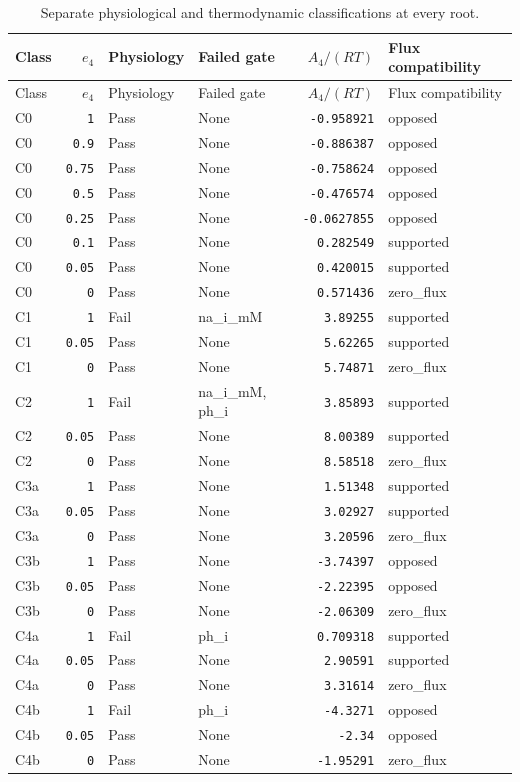 \begingroup\scriptsize
\setlength{\tabcolsep}{3pt}
\begin{longtable}{lrlp{.25\linewidth}rl}
\caption{Separate physiological and thermodynamic classifications at every root.}\\
\toprule
Class & $e_4$ & Physiology & Failed gate & $A_4/(RT)$ & Flux compatibility \\
\midrule\endfirsthead
\toprule
Class & $e_4$ & Physiology & Failed gate & $A_4/(RT)$ & Flux compatibility \\
\midrule\endhead
\bottomrule\endfoot
C0 & \texttt{1} & Pass & None & \texttt{-0.958921} & opposed \\
C0 & \texttt{0.9} & Pass & None & \texttt{-0.886387} & opposed \\
C0 & \texttt{0.75} & Pass & None & \texttt{-0.758624} & opposed \\
C0 & \texttt{0.5} & Pass & None & \texttt{-0.476574} & opposed \\
C0 & \texttt{0.25} & Pass & None & \texttt{-0.0627855} & opposed \\
C0 & \texttt{0.1} & Pass & None & \texttt{0.282549} & supported \\
C0 & \texttt{0.05} & Pass & None & \texttt{0.420015} & supported \\
C0 & \texttt{0} & Pass & None & \texttt{0.571436} & zero\_flux \\
C1 & \texttt{1} & Fail & na\_i\_mM & \texttt{3.89255} & supported \\
C1 & \texttt{0.05} & Pass & None & \texttt{5.62265} & supported \\
C1 & \texttt{0} & Pass & None & \texttt{5.74871} & zero\_flux \\
C2 & \texttt{1} & Fail & na\_i\_mM, ph\_i & \texttt{3.85893} & supported \\
C2 & \texttt{0.05} & Pass & None & \texttt{8.00389} & supported \\
C2 & \texttt{0} & Pass & None & \texttt{8.58518} & zero\_flux \\
C3a & \texttt{1} & Pass & None & \texttt{1.51348} & supported \\
C3a & \texttt{0.05} & Pass & None & \texttt{3.02927} & supported \\
C3a & \texttt{0} & Pass & None & \texttt{3.20596} & zero\_flux \\
C3b & \texttt{1} & Pass & None & \texttt{-3.74397} & opposed \\
C3b & \texttt{0.05} & Pass & None & \texttt{-2.22395} & opposed \\
C3b & \texttt{0} & Pass & None & \texttt{-2.06309} & zero\_flux \\
C4a & \texttt{1} & Fail & ph\_i & \texttt{0.709318} & supported \\
C4a & \texttt{0.05} & Pass & None & \texttt{2.90591} & supported \\
C4a & \texttt{0} & Pass & None & \texttt{3.31614} & zero\_flux \\
C4b & \texttt{1} & Fail & ph\_i & \texttt{-4.3271} & opposed \\
C4b & \texttt{0.05} & Pass & None & \texttt{-2.34} & opposed \\
C4b & \texttt{0} & Pass & None & \texttt{-1.95291} & zero\_flux \\
\end{longtable}
